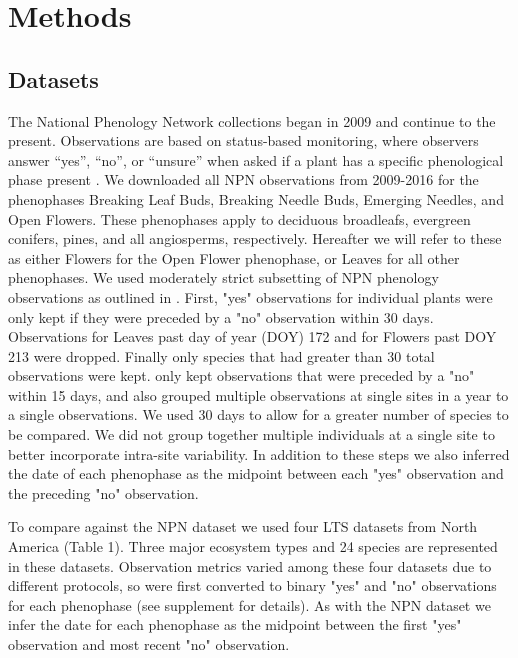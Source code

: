 \documentclass[fleqn,10pt,lineno]{wlpeerj} %
\begin{document}
\section*{Methods}

\subsection*{Datasets}

The National Phenology Network collections began in 2009 and continue to the present. Observations are based on status-based monitoring, where observers answer “yes”, “no”, or “unsure” when asked if a plant has a specific phenological phase present \citep{denny2014}. We downloaded all NPN observations from 2009-2016 for the phenophases Breaking Leaf Buds, Breaking Needle Buds, Emerging Needles, and Open Flowers. These phenophases apply to deciduous broadleafs, evergreen conifers, pines, and all angiosperms, respectively. Hereafter we will refer to these as either Flowers for the Open Flower phenophase, or Leaves for all other phenophases. We used moderately strict subsetting of NPN phenology observations as outlined in \cite{crimmins2017}. First, "yes" observations for individual plants were only kept if they were preceded by a "no" observation within 30 days. Observations for Leaves past day of year (DOY) 172 and for Flowers past DOY 213 were dropped. Finally only species that had greater than 30 total observations were kept. \cite{crimmins2017} only kept observations that were preceded by a "no" within 15 days, and also grouped multiple observations at single sites in a year to a single observations. We used 30 days to allow for a greater number of species to be compared. We did not group together multiple individuals at a single site to better incorporate intra-site variability. In addition to these steps we also inferred the date of each phenophase as the midpoint between each "yes" observation and the preceding "no" observation. 

To compare against the NPN dataset we used four LTS datasets from North America (Table 1). Three major ecosystem types and 24 species are represented in these datasets. Observation metrics varied among these four datasets due to different protocols, so were first converted to binary "yes" and "no" observations for each phenophase (see supplement for details). As with the NPN dataset we infer the date for each phenophase as the midpoint between the first "yes" observation and most recent "no" observation. 
\end{document}
